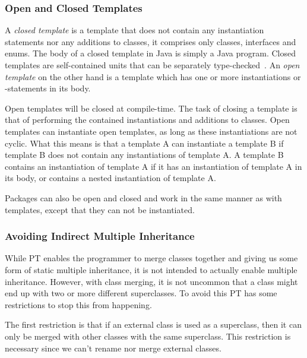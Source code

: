 \subsubsection{Open and Closed Templates}\label{subsubsec:open-and-closed-templates}

A \textit{closed template} is a template that does not contain any instantiation statements nor any additions to classes, it comprises only classes, interfaces and enums.
The body of a closed template in Java is simply a Java program.
Closed templates are self-contained units that can be separately type-checked~\cite{Axelsen2012}.
An \textit{open template} on the other hand is a template which has one or more instantiations or -statements in its body.

Open templates will be closed at compile-time.
The task of closing a template is that of performing the contained instantiations and additions to classes.
Open templates can instantiate open templates, as long as these instantiations are not cyclic.
What this means is that a template A can instantiate a template B if template B does not contain any instantiations of template A\@.
A template B contains an instantiation of template A if it has an instantiation of template A in its body, or contains a nested instantiation of template A\@.

Packages can also be open and closed and work in the same manner as with templates, except that they can not be instantiated.

\subsubsection{Avoiding Indirect Multiple Inheritance}\label{subsubsec:avoiding-indirect-multiple-inheritance}

While PT enables the programmer to merge classes together and giving us some form of static multiple inheritance, it is not intended to actually enable multiple inheritance.
However, with class merging, it is not uncommon that a class might end up with two or more different superclasses.
To avoid this PT has some restrictions to stop this from happening.

The first restriction is that if an external class is used as a superclass, then it can only be merged with other classes with the same superclass.
This restriction is necessary since we can't rename nor merge external classes.

